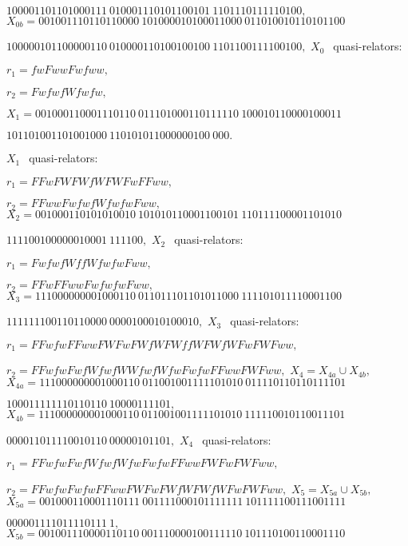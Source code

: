  
 \hfill
$100001101101000111\ 
010001110101100101\ 
1101110111110100,$  
 \noindent $X_{0b} = 
001001110110110000\ 
101000010100011000\ 
011010010110101100$

\hfill
$100000101100000110\ 
010000110100100100\ 
1101100111100100,$ 
 \vglue4pt
\noindent  $X_0\ \ $ quasi\/{\rm -}\/relators\/{\rm :}

$r_1 = fwFwwFwfww,$
 
$r_2 = FwfwfWfwfw,$

\vglue8pt
\noindent $X_1 = 
001000110001110110\ 
011101000110111110\ 
100010110000100011$\hfill 

\hfill $
101101001101001000\ 
110101011000000100\ 
000.$ 

\noindent $X_1\ \ 
$ quasi\/{\rm -}\/relators\/{\rm :}

$r_1 = FFwFWFWfWFWFwFFww,$
 
$r_2 = FFwwFwfwfWfwfwFww,$
\noindent $X_2 = 
001000110101010010\ 
101010110001100101\ 
110111100001101010$\hfill

\hfill $111100100000010001\ 
111100,$
\noindent $X_2\ \ $ quasi\/{\rm -}\/relators\/{\rm :}

$r_1 = FwfwfWffWfwfwFww,$

$r_2 = FFwFFwwFwfwfwFww,$
\noindent 
$X_3 = 
111000000001000110\ 
011011101101011000\ 
111101011110001100$\hfill

\hfill  
$111111100110110000\ 
0000100010100010,$
\noindent $X_3\ \ $ quasi\/{\rm -}\/relators\/{\rm :}\/

$r_1 = FFwfwFFwwFWFwFWfWFWffWFWfWFwFWFww,$ 

$r_2 = FFwfwFwfWfwfWWfwfWfwFwfwFFwwFWFww,$
\vglue4pt 
\noindent $X_4 = X_{4a} \cup X_{4b},$
\noindent $X_{4a} = 
111000000001000110\ 
011001001111101010\ 
011110110110111101$\hfill

\hfill  
$100011111110110110\ 
10000111101,$
\noindent $X_{4b} = 
111000000001000110\ 
011001001111101010\ 
111110010110011101$\hfill

\hfill  
$000011011110010110\ 
00000101101,$
\vglue4pt
\noindent $X_4\ \ $ quasi\/{\rm -}\/relators\/{\rm :}

$r_1 = FFwfwFwfWfwfWfwFwfwFFwwFWFwFWFww,$

$r_2 = FFwfwFwfwFFwwFWFwFWfWFWfWFwFWFww,$
\vglue4pt
\noindent $X_5 = X_{5a} \cup X_{5b},$
\vglue4pt
\noindent $X_{5a} = 
001000110001110111\ 
001111000101111111\ 
101111100111001111$\hfill

\hfill 
$000001111011110111\ 1,$
\vglue4pt
\noindent  $X_{5b} = 
001001110000110110\ 
001110000100111110\ 
101110100110001110$\hfill

